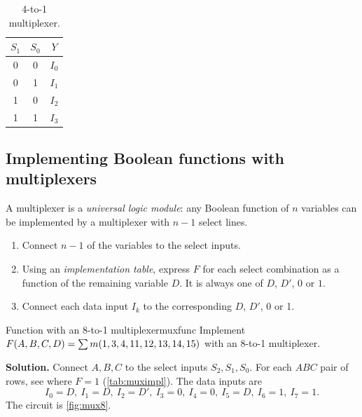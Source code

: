 \begin{table}[htbp]
\centering
\caption{4-to-1 multiplexer.}
\label{tab:mux4}
\begin{tabular}{cc|c}
\toprule $S_1$&$S_0$&$Y$\\ \midrule 0&0&$I_0$\\0&1&$I_1$\\1&0&$I_2$\\1&1&$I_3$\\ \bottomrule
\end{tabular}
\end{table}



\subsection{Implementing Boolean functions with multiplexers}
A multiplexer is a \emph{universal logic module}: any Boolean function of $n$ variables can be implemented by a multiplexer with $n-1$ select lines.
\begin{enumerate}
  \item Connect $n-1$ of the variables to the select inputs.
  \item Using an \emph{implementation table}, express $F$ for each select combination as a function of the remaining variable $D$. It is always one of $D$, $D'$, $0$ or $1$.
  \item Connect each data input $I_k$ to the corresponding $D$, $D'$, 0 or 1.
\end{enumerate}

\begin{example}{Function with an 8-to-1 multiplexer}{muxfunc}
Implement $F(A,B,C,D)=\sum m(1,3,4,11,12,13,14,15)$ with an 8-to-1 multiplexer.

\textbf{Solution.} Connect $A,B,C$ to the select inputs $S_2,S_1,S_0$. For each $ABC$ pair of rows, see where $F=1$ (\cref{tab:muximpl}). The data inputs are
\[
 I_0=D,\ I_1=D,\ I_2=D',\ I_3=0,\ I_4=0,\ I_5=D,\ I_6=1,\ I_7=1 .
\]
The circuit is \cref{fig:mux8}.
\end{example}

